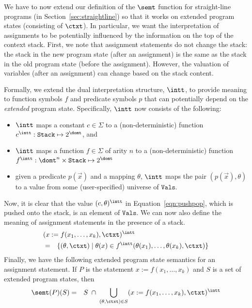 \documentclass[preprint]{sig-alternate-05-2015}
\def\Sig{{\Sigma}}
\def\Stack{{\mathtt{Stack}}}
\def\vals{{\mathtt{Vals}}}
\begin{document}
{%

We have to now extend our definition of
the $\semt$ function
for straight-line programs (in Section~\ref{sec:straightline}) so
that it
works on extended program states (consisting of $\ctxt$).
In particular, we want the interpretation of assignments to be
potentially influenced by the
information on the top of the context stack.
First, we note that assignment statements do not change the stack:
the stack in the new program state (after an assignment) is the same as
the stack in the old program state (before the assignment).
However, the valuation of variables (after an assignment) can change
based on the stack content.

Formally, we extend the dual interpretation
structure, $\intt$, to provide meaning to function symbols
$f$ and predicate symbols $p$ that can potentially depend on
the {\em{extended}} program state.
Specifically, $\intt$ now consists of the following:
\begin{itemize}
  \item $\intt$ maps a constant $c\in\Sig$
    to a (non-deterministic) function
    $c^\intt:\Stack \mapsto 2^{\domt}$, and
  \item $\intt$ maps a function $f\in\Sig$
    of arity $n$ to a (non-deterministic) function
    $f^\intt:\domt^n \times \Stack \mapsto 2^{\domt}$
  \item given a predicate $p(\vec{x})$ and a mapping $\theta$,
    $\intt$ maps the pair $(p(\vec{x}),\theta)$
    to a value from some (user-specified)
    universe of $\vals$. %
\end{itemize}

Now, it is clear that the value $(c,\theta)^\intt$ in Equation~\ref{eqn:pushpop},
which is pushed onto the stack, is an element of $\vals$.
We can now also define the meaning of assignment statements in the presence of
a stack.
    \begin{eqnarray*}
    \lefteqn{(x := f(x_1,\ldots,x_k), \ctxt)^\intt} & & \nonumber
\\ & = &
    \{(\theta,\ctxt) \mid \theta(x) \in f^\intt(\theta(x_1),\ldots,\theta(x_k),\ctxt) \}
    \end{eqnarray*}
Finally, we have the following extended program state semantics for an assignment statement.
If $P$ is the statement $x := f(x_1,\ldots,x_k)$ and $S$ is a set of extended program states, then
  \begin{eqnarray*}
    \semt(P)(S) & = & S \;\cap\;
      \bigcup_{(\theta,\ctxt)\in S} (x := f(x_1,\ldots,x_k),\ctxt)^\intt
  \end{eqnarray*}

}
\end{document}
